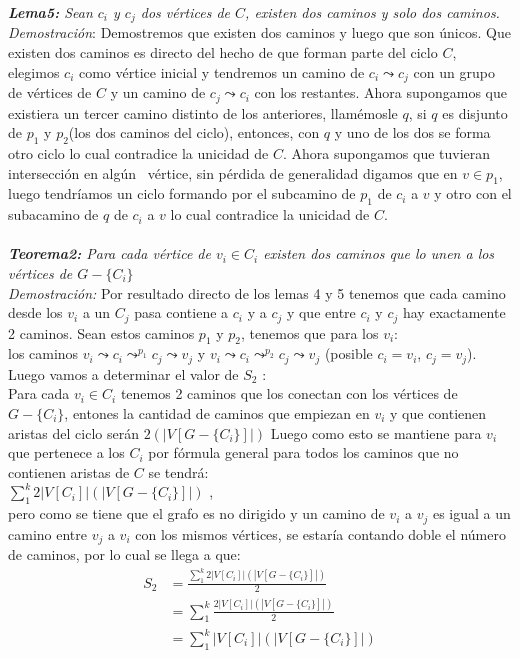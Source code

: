 \documentclass[12pt]{article}
\begin{document}
\textit{\textbf{Lema5:}
Sean $c_i$ y $c_j$ dos v\'ertices de $C$, existen dos caminos y solo dos caminos.}\\
\textit{Demostraci\'on}: Demostremos que existen dos caminos y luego que son \'unicos.
Que existen dos caminos es directo del hecho de que forman parte del ciclo $C$, elegimos $c_i$ como v\'ertice inicial y tendremos un camino de
 $c_i\leadsto c_j$  con un grupo de v\'ertices de $C$ y un camino de $c_j\leadsto c_i$ con los restantes. Ahora supongamos que existiera
 un tercer camino distinto de los anteriores, llam\'emosle $q$, si $q$ es disjunto de $p_1$ y $p_2$(los dos caminos del ciclo), entonces, 
con $q$ y uno de los dos se forma otro ciclo lo cual contradice la unicidad de $C$. Ahora supongamos que tuvieran intersecci\'on en alg\'un \
v\'ertice, sin p\'erdida de generalidad digamos que en $v\in p_1$, luego tendr\'iamos un ciclo formando por el subcamino de $p_1$ de $c_i$ a
 $v$ y otro con el subacamino de $q$ de $c_i$ a $v$ lo cual contradice la unicidad de $C$.\\
\\

\textit{\textbf{Teorema2:} Para cada v\'ertice de $v_i\in C_i$ existen dos caminos que lo unen a los v\'ertices de $G-\{C_i\}$}\\
\textit{Demostraci\'on:} Por resultado directo de los lemas 4 y 5 tenemos que cada camino desde los $v_i$ a un $C_j$ pasa contiene a 
$c_i$ y a $c_j$ y que entre $c_i$ y $c_j$ hay exactamente 2 caminos. Sean estos caminos $p_1$ y $p_2$, tenemos que para los $v_i$:\\
los caminos $v_i\leadsto c_i\leadsto^{p_1} c_j\leadsto v_j$ y  $v_i\leadsto c_i\leadsto^{p_2} c_j\leadsto v_j$ (posible $c_i=v_i$, $c_j=v_j$).\\

Luego vamos a determinar el valor de $S_2$ :\\
Para cada $v_i\in C_i$ tenemos 2 caminos que los conectan con los v\'ertices de $G-\{C_i\}$, entones la cantidad de caminos que 
empiezan en $v_i$ y que contienen aristas del ciclo ser\'an  $2(| V[G-\{C_i\}] |)$ Luego como esto se mantiene para $v_i$ que pertenece a los 
$C_i$ por f\'ormula general para todos los caminos que no contienen aristas de $C$ se tendr\'a:\\
$\sum\limits_{1}^{k} 2|V[C_i]|(| V[G-\{C_i\}] |)$ , \\
pero como se tiene que el grafo es no dirigido y un camino de $v_i$ a $v_j$ es igual a un camino entre $v_j$ a $v_i$ con los 
mismos v\'ertices, se estar\'ia contando doble el n\'umero de caminos, por lo cual se llega a que:\\
\begin{equation}
\begin{split}
S_2 &= \frac{ \sum\limits_{1}^{k} 2|V[C_i]|(| V[G-\{C_i\}] |) }{2}\\
    &=  \sum\limits_{1}^{k} \frac{  2|V[C_i]|(| V[G-\{C_i\}] |)}{2}\\
    &= \sum\limits_{1}^{k} |V[C_i]|(| V[G-\{C_i\}] |) \\
\end{split}
\end{equation}
\end{document}
